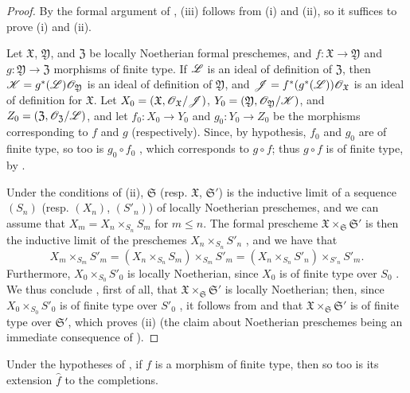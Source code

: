 \begin{proof}
\label{proof-1.10.13.5}
By the formal argument of , (iii) follows from (i) and (ii), so it suffices to prove (i) and (ii).

Let $\mathfrak{X}$, $\mathfrak{Y}$, and $\mathfrak{Z}$ be locally Noetherian formal preschemes, and $f:\mathfrak{X}\to\mathfrak{Y}$ and $g:\mathfrak{Y}\to\mathfrak{Z}$ morphisms of finite type.
If $\mathscr{L}$ is an ideal of definition of $\mathfrak{Z}$, then $\mathscr{K}=g^*(\mathscr{L})\mathscr{O}_\mathfrak{Y}$ is an ideal of definition of $\mathfrak{Y}$, and $\mathscr{J}=f^*(g^*(\mathscr{L}))\mathscr{O}_\mathfrak{X}$ is an ideal of definition for $\mathfrak{X}$.
Let $X_0=(\mathfrak{X},\mathscr{O}_\mathfrak{X}/\mathscr{J})$, $Y_0=(\mathfrak{Y},\mathscr{O}_\mathfrak{Y}/\mathscr{K})$, and $Z_0=(\mathfrak{Z},\mathscr{O}_\mathfrak{Z}/\mathscr{L})$, and let $f_0:X_0\to Y_0$ and $g_0:Y_0\to Z_0$ be the morphisms corresponding to $f$ and $g$ (respectively).
Since, by hypothesis, $f_0$ and $g_0$ are of finite type, so too is $g_0\circ f_0$ , which corresponds to $g\circ f$;
thus $g\circ f$ is of finite type, by .

Under the conditions of (ii), $\mathfrak{S}$ (resp. $\mathfrak{X}$, $\mathfrak{S}'$) is the inductive limit of a sequence $(S_n)$ (resp. $(X_n)$, $(S'_n)$) of locally Noetherian preschemes, and we can assume  that $X_m=X_n\times_{S_n}S_m$ for $m\leq n$.
The formal prescheme $\mathfrak{X}\times_\mathfrak{S}\mathfrak{S}'$ is then the inductive limit of the preschemes $X_n\times_{S_n}S'_n$ , and we have that
\[
    X_m\times_{S_m}S'_m = (X_n\times_{S_n}S_m)\times_{S_m}S'_m = (X_n\times_{S_n}S'_n)\times_{S'_n}S'_m.
\]
Furthermore, $X_0\times_{S_0}S'_0$ is locally Noetherian, since $X_0$ is of finite type over $S_0$ .
We thus conclude , first of all, that $\mathfrak{X}\times_\mathfrak{S}\mathfrak{S}'$ is locally Noetherian;
then, since $X_0\times_{S_0}S'_0$ is of finite type over $S'_0$ , it follows from  and  that $\mathfrak{X}\times_\mathfrak{S}\mathfrak{S}'$ is of finite type over $\mathfrak{S}'$, which proves (ii) (the claim about Noetherian preschemes being an immediate consequence of ).
\end{proof}

\begin{corollary}[10.13.6]
\label{1.10.13.6}
Under the hypotheses of , if $f$ is a morphism of finite type, then so too is its extension $\widehat{f}$ to the completions.
\end{corollary}

